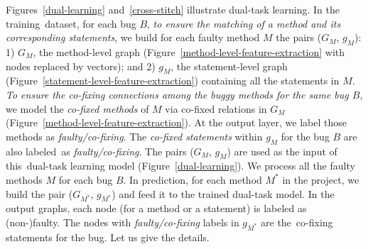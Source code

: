 Figures~\ref{dual-learning} and~\ref{cross-stitch} illustrate 
dual-task learning. In the training~dataset, for each bug $B$, {\em to
  ensure the matching of a method and its corresponding statements},
we build for each faulty method $M$ the pairs ($G_M$, $g_M$): 1) $G_M$,
the method-level graph (Figure~\ref{method-level-feature-extraction}
with nodes replaced by vectors); and 2) $g_M$, the statement-level graph
(Figure~\ref{statement-level-feature-extraction}) containing all
the statements in $M$. {\em To ensure the co-fixing connections among the
buggy methods for the same bug $B$}, we model the {\em co-fixed
  methods} of $M$ via co-fixed relations in $G_M$
(Figure~\ref{method-level-feature-extraction}). At the output layer,
we label those methods as {\em faulty/co-fixing}. The {\em co-fixed
  statements} within $g_M$ for the bug $B$ are also labeled~as {\em
  faulty/co-fixing}. The pairs ($G_M$, $g_M$) are used as the input of
this~dual-task learning model (Figure~\ref{dual-learning}). We process
all the faulty methods $M$ for each bug $B$. In prediction, for each
method $M^{*}$ in the project, we build the pair ($G_{M^{*}}$,
$g_{M^{*}}$) and feed it to the trained dual-task model. In the output
graphs, each node (for a method or a statement) is labeled as
(non-)faulty. The nodes with {\em faulty/co-fixing} labels in
$g_{M^{*}}$ are the~co-fixing statements for the bug. Let us give the
details.








